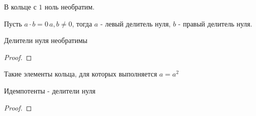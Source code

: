 \documentclass[../main/document.tex]{subfiles}
\begin{document}
\begin{cnsq}
В кольце с $1$ ноль необратим.
\end{cnsq}
\begin{dfn}
Пусть $a\cdot b=0\, a,b\neq 0$, тогда $a$ - левый делитель нуля, $b$ - правый делитель нуля.
\end{dfn}
\begin{exm}

\end{exm}
\begin{thm}
Делители нуля необратимы
\begin{proof}

\end{proof}
\end{thm}
\begin{dfn}
Такие элементы кольца, для которых выполняется $a=a^2$
\end{dfn}
\begin{thm}
Идемпотенты - делители нуля
\begin{proof}

\end{proof}
\end{thm}
\begin{dfn}

\end{dfn}
\end{document}
